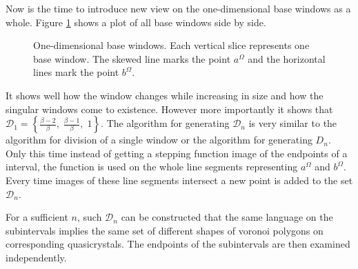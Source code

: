\documentclass[text.tex]{subfiles}
\begin{document}
Now is the time to introduce new view on the one-dimensional base windows as a whole. Figure \ref{fig:allBaseWindows} shows a plot of all base windows side by side.

\begin{figure}[h]
\centering
{}
\caption{One-dimensional base windows. Each vertical slice represents one base window. The skewed line marks the point $a^\Omega$ and the horizontal lines mark the point $b^\Omega$.}
\label{fig:allBaseWindows}
\end{figure}

It shows well how the window changes while increasing in size and how the singular windows come to existence. However more importantly it shows that $\mathcal{D}_1 = \left\{\frac{\beta-2}{\beta},\; \frac{\beta-1}{\beta},\; 1\right\}$.
The algorithm for generating $\mathcal{D}_n$ is very similar to the algorithm for division of a single window or the algorithm for generating $D_n$. Only this time instead of getting a stepping function image of the endpoints of a interval, the function is used on the whole line segments representing $a^\Omega$ and $b^\Omega$. Every time images of these line segments intersect a new point is added to the set $\mathcal{D}_n$.

For a sufficient $n$, such $\mathcal{D}_n$ can be constructed that the same language on the subintervals implies the same set of different shapes of voronoi polygons on corresponding quasicrystals. The endpoints of the subintervals are then examined independently. 
\end{document}
